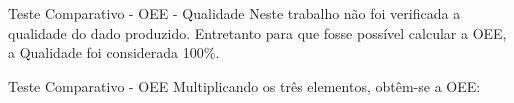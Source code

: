 \documentclass{beamer}
\begin{document}
    \begin{frame}{Teste Comparativo - OEE - Qualidade}
      \quad Neste trabalho não foi verificada a qualidade do dado produzido. Entretanto para que fosse possível calcular a OEE, a Qualidade foi considerada 100\%.
    \end{frame}
    \begin{frame}{Teste Comparativo - OEE}
        \quad Multiplicando os três elementos, obtêm-se a OEE:
        \begin{center}

        \end{center}
    \end{frame}
\end{document}
